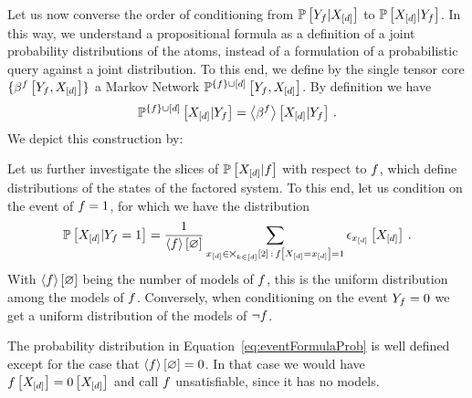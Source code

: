 
Let us now converse the order of conditioning from $\mathbb{P}\left[Y_{f}|X_{[d]}\right]$ to $\mathbb{P}\left[X_{[d]}|Y_{f}\right]$.
In this way, we understand a propositional formula as a definition of a joint probability distributions of the atoms, instead of a formulation of a probabilistic query against a joint distribution.
To this end, we define by the single tensor core $\{\beta^{f}\left[Y_{f},X_{[d]}\right]\}$ a Markov Network $\mathbb{P}^{\{f\}\cup[d]}\left[Y_{f},X_{[d]}\right]$.
By definition we have
\begin{align*}
    \mathbb{P}^{\{f\}\cup[d]}\left[X_{[d]}|Y_{f}\right]
    = \left\langle \beta^{f}\right\rangle \left[ X_{[d]} | Y_{f} \right] \, .
\end{align*}
We depict this construction by:
\begin{center}
    
\end{center}

Let us further investigate the slices of $\mathbb{P}\left[X_{[d]}|f\right]$ with respect to $f$, which define distributions of the states of the factored system.
To this end, let us condition on the event of $f=1$, for which we have the distribution
\begin{align}
    \label{eq:eventFormulaProb}
    \mathbb{P}\left[X_{[d]}|Y_{f}=1\right] = \frac{1}{\left\langle f\right\rangle \left[ \varnothing \right]}
    \sum_{x_{[d]}\in\bigtimes_{k\in[d]}[2] \, : \, f\left[X_{[d]}=x_{[d]}\right]=1} \epsilon_{x_{[d]}}\left[X_{[d]}\right] \, .
\end{align}
With $\left\langle f\right\rangle \left[ \varnothing \right]$ being the number of models of $f$, this is the uniform distribution among the models of $f$.
Conversely, when conditioning on the event $Y_{f}=0$ we get a uniform distribution of the models of $\lnot f$.

% 
The probability distribution in Equation~\eqref{eq:eventFormulaProb} is well defined except for the case that $\left\langle f\right\rangle \left[ \varnothing \right]=0$.
In that case we would have $f\left[X_{[d]}\right]=0\left[X_{[d]}\right]$ and call $f$ unsatisfiable, since it has no models.

